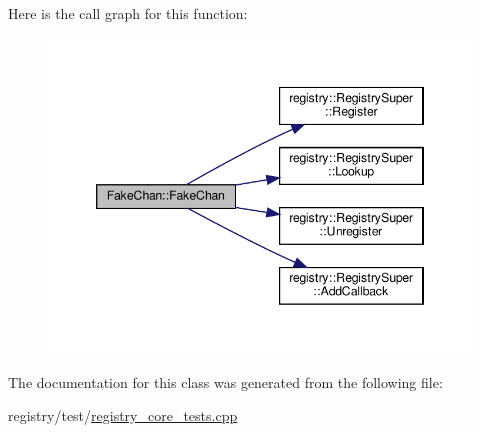 Here is the call graph for this function\+:
\nopagebreak
\begin{figure}[H]
\begin{center}
\leavevmode
\includegraphics[width=346pt]{classFakeChan_ad3563b881623aa552d98e78c24baef6c_cgraph}
\end{center}
\end{figure}


The documentation for this class was generated from the following file\+:\begin{DoxyCompactItemize}
\item 
registry/test/\hyperlink{registry__core__tests_8cpp}{registry\+\_\+core\+\_\+tests.\+cpp}\end{DoxyCompactItemize}
